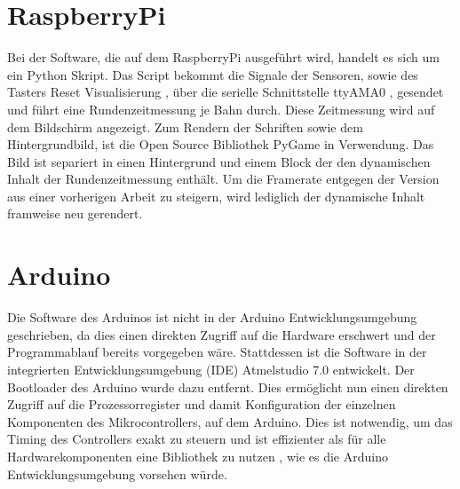 \documentclass[a4paper, 11pt]{report}
\begin{document}
	\section{RaspberryPi}\label{sec:SoftPi}
		Bei der Software, die auf dem RaspberryPi ausgeführt wird, handelt es sich um ein Python Skript.
		Das Script bekommt die Signale der Sensoren, sowie des Tasters \glqq Reset Visualisierung \grqq, über die serielle Schnittstelle \glqq ttyAMA0 \grqq, 
		gesendet und führt eine Rundenzeitmessung je Bahn durch.
		Diese Zeitmessung wird auf dem Bildschirm angezeigt.
		Zum Rendern der Schriften sowie dem Hintergrundbild, ist die Open Source Bibliothek \glqq PyGame\grqq{} in Verwendung.
		Das Bild ist separiert in einen Hintergrund und einem Block der den dynamischen Inhalt der Rundenzeitmessung enthält.
		Um die Framerate entgegen der Version aus einer vorherigen Arbeit zu steigern, wird lediglich der dynamische Inhalt framweise neu gerendert.
	\section{Arduino}
		Die Software des Arduinos ist nicht in der Arduino Entwicklungsumgebung geschrieben, da dies einen direkten Zugriff auf die Hardware erschwert und der Programmablauf bereits vorgegeben wäre.
		Stattdessen ist die Software in der integrierten Entwicklungsumgebung (IDE) \glqq Atmelstudio 7.0\grqq{} entwickelt.
		Der Bootloader des Arduino wurde dazu entfernt.
		Dies ermöglicht nun einen direkten Zugriff auf die Prozessorregister und damit Konfiguration der einzelnen Komponenten des Mikrocontrollers, auf dem Arduino.
		Dies ist notwendig, um das Timing des Controllers exakt zu steuern und ist effizienter als für alle Hardwarekomponenten eine Bibliothek zu nutzen , wie es die Arduino Entwicklungsumgebung vorsehen würde.
\end{document}
